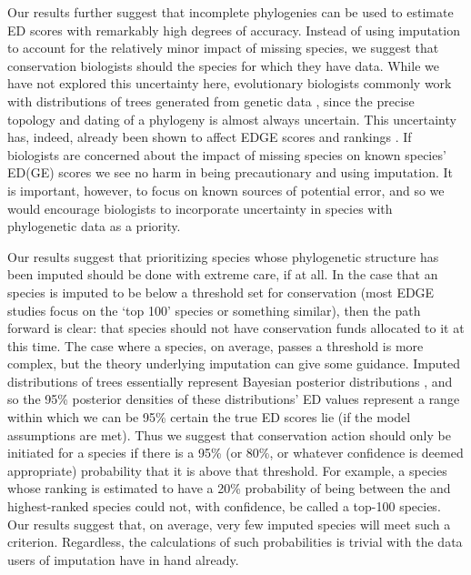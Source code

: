 \documentclass[10pt,english]{article}
\begin{document}
Our results further suggest that incomplete phylogenies can be used to estimate
ED scores with remarkably high degrees of accuracy. Instead of using imputation
to account for the relatively minor impact of missing species, we
suggest that conservation biologists should   the
species for which they have data. While we
have not explored this uncertainty here, evolutionary biologists commonly work
with distributions of trees generated from genetic data \autocite[reviewed
in][]{Huelsenbeck2001, Bollback2005}, since the precise topology and dating of a
phylogeny is almost always uncertain. This uncertainty has, indeed, already been
shown to affect EDGE scores and rankings \autocite{Pearse2015}. If biologists
are concerned about the impact of missing species on known species' ED(GE)
scores we see no harm in being precautionary and using imputation. It is
important, however, to focus on known sources of potential error, and so we
would encourage biologists to incorporate uncertainty in species with
phylogenetic data as a priority.

Our results suggest that prioritizing species whose phylogenetic structure has
been imputed should be done with extreme care, if at all. In the case that an
species is imputed to be below a threshold set for conservation (most EDGE
studies focus on the ‘top 100' species or something similar), then the path
forward is clear: that species should not have conservation funds allocated to
it at this time. The case where a species, on average, passes a threshold is
more complex, but the theory underlying imputation can give some guidance.
Imputed distributions of trees essentially represent Bayesian posterior
distributions \autocite{Kuhn2011}, and so the 95\% posterior densities of these
distributions' ED values represent a range within which we can be 95\% certain
the true ED scores lie (if the model assumptions are met). Thus we suggest that
conservation action should only be initiated for a species if there is a 95\%
(or 80\%, or whatever confidence is deemed appropriate) probability that it is
above that threshold. For example, a species whose ranking is estimated to have
a 20\% probability of being between the  and  highest-ranked
species could not, with confidence, be called a top-100 species. Our results
suggest that, on average, very few imputed species will meet such a criterion.
Regardless, the calculations of such probabilities is trivial with the data
users of imputation have in hand already.
\end{document}
